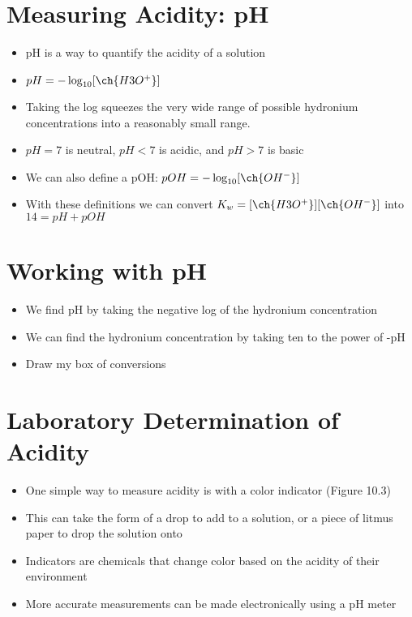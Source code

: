 \documentclass[12pt, openany, letterpaper]{memoir}
\begin{document}
\section{Measuring Acidity: pH}
\begin{itemize}
	\item pH is a way to quantify the acidity of a solution
	\item $pH=-\log_{10}[\ch{H3O^+}]$
	\item Taking the log squeezes the very wide range of possible hydronium concentrations into a reasonably small range.
	\item $pH=7$ is neutral, $pH<7$ is acidic, and $pH>7$ is basic
	\item We can also define a pOH: $pOH=-\log_{10}[\ch{OH^-}]$
	\item With these definitions we can convert $K_w=[\ch{H3O^+}][\ch{OH^-}]$ into $14=pH+pOH$
\end{itemize}
\section{Working with pH}
\begin{itemize}
	\item We find pH by taking the negative log of the hydronium concentration
	\item We can find the hydronium concentration by taking ten to the power of -pH
	\item Draw my box of conversions
\end{itemize}
\section{Laboratory Determination of Acidity}
\begin{itemize}
	\item One simple way to measure acidity is with a color indicator (Figure 10.3)
	\item This can take the form of a drop to add to a solution, or a piece of litmus paper to drop the solution onto
	\item Indicators are chemicals that change color based on the acidity of their environment
	\item More accurate measurements can be made electronically using a pH meter
\end{itemize}
\end{document}
